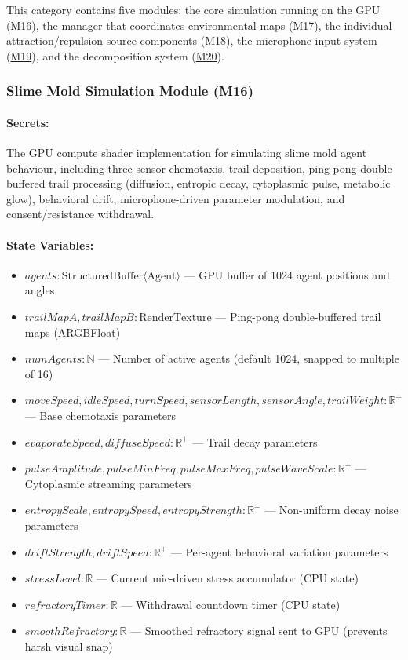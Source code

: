 \documentclass[12pt, titlepage]{article}
\begin{document}
This category contains five modules: the core simulation running on the GPU
(\hyperref[M16]{M16}), the manager that coordinates environmental maps
(\hyperref[M17]{M17}), the individual attraction/repulsion source components
(\hyperref[M18]{M18}), the microphone input system (\hyperref[M19]{M19}), and
the decomposition system (\hyperref[M20]{M20}).

\subsubsection{Slime Mold Simulation Module (M16)} \label{M16}

\paragraph{Secrets:}
The GPU compute shader implementation for simulating slime mold agent behaviour, including
three-sensor chemotaxis, trail deposition, ping-pong double-buffered trail processing
(diffusion, entropic decay, cytoplasmic pulse, metabolic glow), behavioral drift,
microphone-driven parameter modulation, and consent/resistance withdrawal.

\paragraph{State Variables:}
\begin{itemize}
\item $agents : \text{StructuredBuffer}\langle\text{Agent}\rangle$ --- GPU buffer of 1024 agent positions and angles
\item $trailMapA, trailMapB : \text{RenderTexture}$ --- Ping-pong double-buffered trail maps (ARGBFloat)
\item $numAgents : \mathbb{N}$ --- Number of active agents (default 1024, snapped to multiple of 16)
\item $moveSpeed, idleSpeed, turnSpeed, sensorLength, sensorAngle, trailWeight : \mathbb{R}^+$ --- Base chemotaxis parameters
\item $evaporateSpeed, diffuseSpeed : \mathbb{R}^+$ --- Trail decay parameters
\item $pulseAmplitude, pulseMinFreq, pulseMaxFreq, pulseWaveScale : \mathbb{R}^+$ --- Cytoplasmic streaming parameters
\item $entropyScale, entropySpeed, entropyStrength : \mathbb{R}^+$ --- Non-uniform decay noise parameters
\item $driftStrength, driftSpeed : \mathbb{R}^+$ --- Per-agent behavioral variation parameters
\item $stressLevel : \mathbb{R}$ --- Current mic-driven stress accumulator (CPU state)
\item $refractoryTimer : \mathbb{R}$ --- Withdrawal countdown timer (CPU state)
\item $smoothRefractory : \mathbb{R}$ --- Smoothed refractory signal sent to GPU (prevents harsh visual snap)
\end{itemize}
\end{document}
